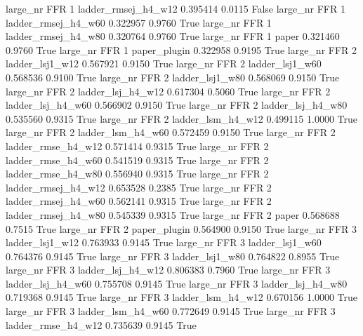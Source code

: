   large_nr      FFR                 1 ladder_rmsej_h4_w12   0.395414      0.0115   False
  large_nr      FFR                 1 ladder_rmsej_h4_w60   0.322957      0.9760    True
  large_nr      FFR                 1 ladder_rmsej_h4_w80   0.320764      0.9760    True
  large_nr      FFR                 1               paper   0.321460      0.9760    True
  large_nr      FFR                 1        paper_plugin   0.322958      0.9195    True
  large_nr      FFR                 2     ladder_lsj1_w12   0.567921      0.9150    True
  large_nr      FFR                 2     ladder_lsj1_w60   0.568536      0.9100    True
  large_nr      FFR                 2     ladder_lsj1_w80   0.568069      0.9150    True
  large_nr      FFR                 2   ladder_lsj_h4_w12   0.617304      0.5060    True
  large_nr      FFR                 2   ladder_lsj_h4_w60   0.566902      0.9150    True
  large_nr      FFR                 2   ladder_lsj_h4_w80   0.535560      0.9315    True
  large_nr      FFR                 2   ladder_lsm_h4_w12   0.499115      1.0000    True
  large_nr      FFR                 2   ladder_lsm_h4_w60   0.572459      0.9150    True
  large_nr      FFR                 2  ladder_rmse_h4_w12   0.571414      0.9315    True
  large_nr      FFR                 2  ladder_rmse_h4_w60   0.541519      0.9315    True
  large_nr      FFR                 2  ladder_rmse_h4_w80   0.556940      0.9315    True
  large_nr      FFR                 2 ladder_rmsej_h4_w12   0.653528      0.2385    True
  large_nr      FFR                 2 ladder_rmsej_h4_w60   0.562141      0.9315    True
  large_nr      FFR                 2 ladder_rmsej_h4_w80   0.545339      0.9315    True
  large_nr      FFR                 2               paper   0.568688      0.7515    True
  large_nr      FFR                 2        paper_plugin   0.564900      0.9150    True
  large_nr      FFR                 3     ladder_lsj1_w12   0.763933      0.9145    True
  large_nr      FFR                 3     ladder_lsj1_w60   0.764376      0.9145    True
  large_nr      FFR                 3     ladder_lsj1_w80   0.764822      0.8955    True
  large_nr      FFR                 3   ladder_lsj_h4_w12   0.806383      0.7960    True
  large_nr      FFR                 3   ladder_lsj_h4_w60   0.755708      0.9145    True
  large_nr      FFR                 3   ladder_lsj_h4_w80   0.719368      0.9145    True
  large_nr      FFR                 3   ladder_lsm_h4_w12   0.670156      1.0000    True
  large_nr      FFR                 3   ladder_lsm_h4_w60   0.772649      0.9145    True
  large_nr      FFR                 3  ladder_rmse_h4_w12   0.735639      0.9145    True
